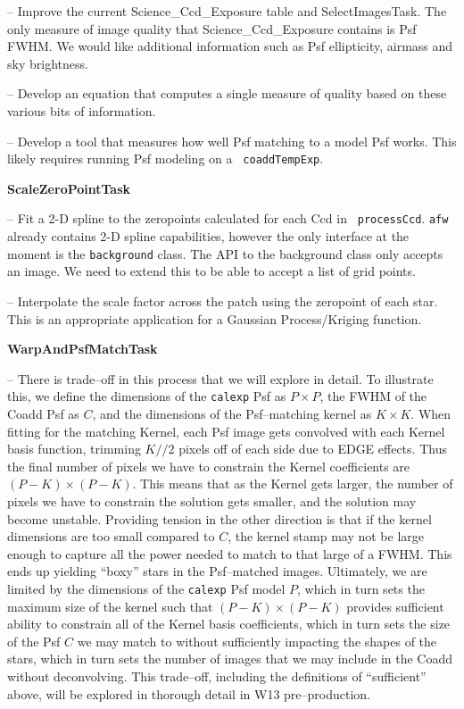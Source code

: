 \documentclass[prd, nofootinbib, floatfix, 11pt,tightenlines,times]{article}
\begin{document}
-- Improve the current Science\_Ccd\_Exposure table and SelectImagesTask.
The only measure of image quality that Science\_Ccd\_Exposure contains is Psf FWHM.
We would like additional information such as Psf ellipticity, airmass and sky brightness.

-- Develop an equation that computes a single measure of quality
based on these various bits of information.

-- Develop a tool that measures how well Psf matching to a model Psf
works. This likely requires running Psf modeling on a {\tt
  coaddTempExp}.


{\bf ScaleZeroPointTask}

-- Fit a 2-D spline to the zeropoints calculated for each Ccd in {\tt
  processCcd}.  {\tt afw} already contains 2-D spline capabilities,
however the only interface at the moment is the {\tt background}
class. The API to the background class only accepts an image. We need
to extend this to be able to accept a list of grid points.

-- Interpolate the scale factor across the patch using the zeropoint
of each star. This is an appropriate application for a Gaussian
Process/Kriging function.

{\bf WarpAndPsfMatchTask}

-- There is trade--off in this process that we will explore in detail.
To illustrate this, we define the dimensions of the {\tt calexp} Psf
as $P \times P$, the FWHM of the Coadd Psf as $C$, and the dimensions
of the Psf--matching kernel as $K \times K$.  When fitting for the
matching Kernel, each Psf image gets convolved with each Kernel basis
function, trimming $K//2$ pixels off of each side due to EDGE effects.
Thus the final number of pixels we have to constrain the Kernel
coefficients are $(P-K) \times (P-K)$.  This means that as the Kernel
gets larger, the number of pixels we have to constrain the solution
gets smaller, and the solution may become unstable.  Providing tension
in the other direction is that if the kernel dimensions are too small
compared to $C$, the kernel stamp may not be large enough to capture
all the power needed to match to that large of a FWHM.  This ends up
yielding ``boxy'' stars in the Psf--matched images.  Ultimately, we
are limited by the dimensions of the {\tt calexp} Psf model $P$, which
in turn sets the maximum size of the kernel such that $(P-K) \times
(P-K)$ provides sufficient ability to constrain all of the Kernel
basis coefficients, which in turn sets the size of the Psf $C$ we may
match to without sufficiently impacting the shapes of the stars, which
in turn sets the number of images that we may include in the Coadd
without deconvolving.  This trade--off, including the definitions of
``sufficient'' above, will be explored in thorough detail in W13
pre--production.
\end{document}
